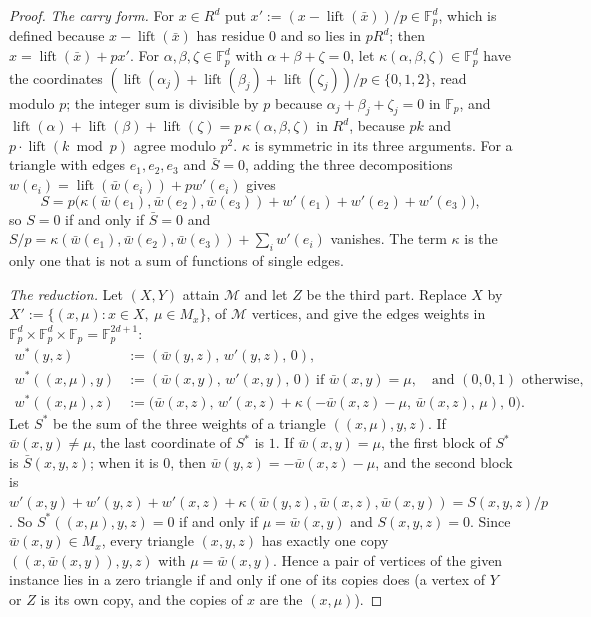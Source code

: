 \documentclass[11pt]{article}
\theoremstyle{definition}
\theoremstyle{remark}
\newcommand{\Fp}{\mathbb{F}_p}
\DeclareMathOperator{\lift}{lift}
\begin{document}
\begin{proof}
\emph{The carry form.} For $x\in R^d$ put $x':=(x-\lift(\bar x))/p\in\Fp^d$, which is defined because $x-\lift(\bar x)$ has residue $0$ and so lies in $pR^d$; then $x=\lift(\bar x)+px'$. For $\alpha,\beta,\zeta\in\Fp^d$ with $\alpha+\beta+\zeta=0$, let $\kappa(\alpha,\beta,\zeta)\in\Fp^d$ have the coordinates $(\lift(\alpha_j)+\lift(\beta_j)+\lift(\zeta_j))/p\in\{0,1,2\}$, read modulo $p$; the integer sum is divisible by $p$ because $\alpha_j+\beta_j+\zeta_j=0$ in $\Fp$, and $\lift(\alpha)+\lift(\beta)+\lift(\zeta)=p\,\kappa(\alpha,\beta,\zeta)$ in $R^d$, because $pk$ and $p\cdot\lift(k\bmod p)$ agree modulo $p^2$. $\kappa$ is symmetric in its three arguments. For a triangle with edges $e_1,e_2,e_3$ and $\bar S=0$, adding the three decompositions $w(e_i)=\lift(\bar w(e_i))+pw'(e_i)$ gives
\[
S=p\bigl(\kappa(\bar w(e_1),\bar w(e_2),\bar w(e_3))+w'(e_1)+w'(e_2)+w'(e_3)\bigr),
\]
so $S=0$ if and only if $\bar S=0$ and $S/p=\kappa(\bar w(e_1),\bar w(e_2),\bar w(e_3))+\sum_iw'(e_i)$ vanishes. The term $\kappa$ is the only one that is not a sum of functions of single edges.

\emph{The reduction.} Let $(X,Y)$ attain $\mathcal M$ and let $Z$ be the third part. Replace $X$ by $X':=\{(x,\mu):x\in X,\ \mu\in M_x\}$, of $\mathcal M$ vertices, and give the edges weights in $\Fp^d\times\Fp^d\times\Fp=\Fp^{2d+1}$:
\begin{align*}
w^\ast(y,z)&:=(\bar w(y,z),\,w'(y,z),\,0),\\
w^\ast((x,\mu),y)&:=(\bar w(x,y),\,w'(x,y),\,0)\ \text{if }\bar w(x,y)=\mu,\quad\text{and }(0,0,1)\text{ otherwise},\\
w^\ast((x,\mu),z)&:=\bigl(\bar w(x,z),\,w'(x,z)+\kappa(-\bar w(x,z)-\mu,\,\bar w(x,z),\,\mu),\,0\bigr).
\end{align*}
Let $S^\ast$ be the sum of the three weights of a triangle $((x,\mu),y,z)$. If $\bar w(x,y)\ne\mu$, the last coordinate of $S^\ast$ is $1$. If $\bar w(x,y)=\mu$, the first block of $S^\ast$ is $\bar S(x,y,z)$; when it is $0$, then $\bar w(y,z)=-\bar w(x,z)-\mu$, and the second block is $w'(x,y)+w'(y,z)+w'(x,z)+\kappa(\bar w(y,z),\bar w(x,z),\bar w(x,y))=S(x,y,z)/p$. So $S^\ast((x,\mu),y,z)=0$ if and only if $\mu=\bar w(x,y)$ and $S(x,y,z)=0$. Since $\bar w(x,y)\in M_x$, every triangle $(x,y,z)$ has exactly one copy $((x,\bar w(x,y)),y,z)$ with $\mu=\bar w(x,y)$. Hence a pair of vertices of the given instance lies in a zero triangle if and only if one of its copies does (a vertex of $Y$ or $Z$ is its own copy, and the copies of $x$ are the $(x,\mu)$).


\end{proof}
\end{document}
